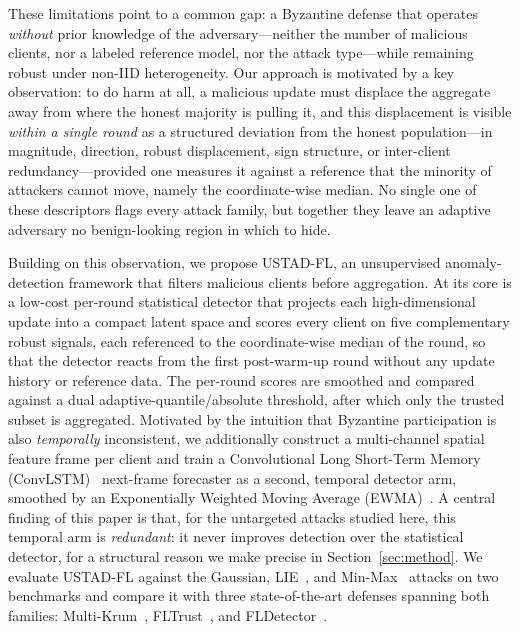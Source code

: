 \documentclass[journal]{IEEEtran}
\begin{document}
These limitations point to a common gap: a Byzantine defense that operates \emph{without} prior knowledge of the adversary---neither the number of malicious clients, nor a labeled reference model, nor the attack type---while remaining robust under non-IID heterogeneity. Our approach is motivated by a key observation: to do harm at all, a malicious update must displace the aggregate away from where the honest majority is pulling it, and this displacement is visible \emph{within a single round} as a structured deviation from the honest population---in magnitude, direction, robust displacement, sign structure, or inter-client redundancy---provided one measures it against a reference that the minority of attackers cannot move, namely the coordinate-wise median. No single one of these descriptors flags every attack family, but together they leave an adaptive adversary no benign-looking region in which to hide.

Building on this observation, we propose USTAD-FL, an unsupervised anomaly-detection framework that filters malicious clients before aggregation. At its core is a low-cost per-round statistical detector that projects each high-dimensional update into a compact latent space and scores every client on five complementary robust signals, each referenced to the coordinate-wise median of the round, so that the detector reacts from the first post-warm-up round without any update history or reference data. The per-round scores are smoothed and compared against a dual adaptive-quantile/absolute threshold, after which only the trusted subset is aggregated. Motivated by the intuition that Byzantine participation is also \emph{temporally} inconsistent, we additionally construct a multi-channel spatial feature frame per client and train a Convolutional Long Short-Term Memory (ConvLSTM)~\cite{shi2015convolutional} next-frame forecaster as a second, temporal detector arm, smoothed by an Exponentially Weighted Moving Average (EWMA)~\cite{hunter1986exponentially}. A central finding of this paper is that, for the untargeted attacks studied here, this temporal arm is \emph{redundant}: it never improves detection over the statistical detector, for a structural reason we make precise in Section~\ref{sec:method}. We evaluate USTAD-FL against the Gaussian, LIE~\cite{baruch2019little}, and Min-Max~\cite{shejwalkar2021manipulating} attacks on two benchmarks and compare it with three state-of-the-art defenses spanning both families: Multi-Krum~\cite{blanchard2017machine}, FLTrust~\cite{cao2020fltrust}, and FLDetector~\cite{zhang2022fldetector}.
\end{document}
